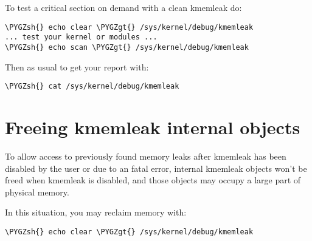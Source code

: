 \documentclass[a4paper,8pt,english]{sphinxmanual}
\def\PYGZgt{\char`\>}
\def\PYGZsh{\char`\#}
\begin{document}
To test a critical section on demand with a clean kmemleak do:

\begin{Verbatim}[commandchars=\\\{\}]
\PYGZsh{} echo clear \PYGZgt{} /sys/kernel/debug/kmemleak
... test your kernel or modules ...
\PYGZsh{} echo scan \PYGZgt{} /sys/kernel/debug/kmemleak
\end{Verbatim}

Then as usual to get your report with:

\begin{Verbatim}[commandchars=\\\{\}]
\PYGZsh{} cat /sys/kernel/debug/kmemleak
\end{Verbatim}


\section{Freeing kmemleak internal objects}
\label{dev-tools/kmemleak:freeing-kmemleak-internal-objects}
To allow access to previously found memory leaks after kmemleak has been
disabled by the user or due to an fatal error, internal kmemleak objects
won't be freed when kmemleak is disabled, and those objects may occupy
a large part of physical memory.

In this situation, you may reclaim memory with:

\begin{Verbatim}[commandchars=\\\{\}]
\PYGZsh{} echo clear \PYGZgt{} /sys/kernel/debug/kmemleak
\end{Verbatim}
\end{document}
